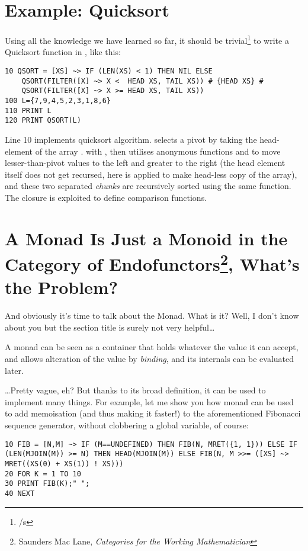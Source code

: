 \section[Example: Quicksort]{Example: Quicksort}

Using all the knowledge we have learned so far, it should be trivial\footnote{/s} to write a Quicksort function in \tbas, like this:

\begin{lstlisting}
10 QSORT = [XS] ~> IF (LEN(XS) < 1) THEN NIL ELSE 
    QSORT(FILTER([X] ~> X <  HEAD XS, TAIL XS)) # {HEAD XS} # 
    QSORT(FILTER([X] ~> X >= HEAD XS, TAIL XS))
100 L={7,9,4,5,2,3,1,8,6}
110 PRINT L
120 PRINT QSORT(L)
\end{lstlisting}

Line 10 implements quicksort algorithm.  selects a pivot by taking the head-element of the array . with , then utilises anonymous functions  and  to move lesser-than-pivot values to the left and greater to the right (the head element itself does not get recursed, here  is applied to make head-less copy of the array), and these two separated \emph{chunks} are recursively sorted using the same  function. The closure is exploited to define comparison functions.

\section[Monad]{A Monad Is Just a Monoid in the Category of Endofunctors\footnote{Saunders Mac Lane, \emph{Categories for the Working Mathematician}}, What's the Problem?}

And obviously it's time to talk about the Monad. What is it? Well, I don't know about you but the section title is surely not very helpful\ldots

A monad can be seen as a container that holds whatever the value it can accept, and allows alteration of the value by \emph{binding}, and its internals can be evaluated later.

\ldots Pretty vague, eh? But thanks to its broad definition, it can be used to implement many things. For example, let me show you how monad can be used to add memoisation (and thus making it faster!) to the aforementioned Fibonacci sequence generator, without clobbering a global variable, of course:

\begin{lstlisting}
10 FIB = [N,M] ~> IF (M==UNDEFINED) THEN FIB(N, MRET({1, 1})) ELSE IF (LEN(MJOIN(M)) >= N) THEN HEAD(MJOIN(M)) ELSE FIB(N, M >>= ([XS] ~> MRET((XS(0) + XS(1)) ! XS)))
20 FOR K = 1 TO 10
30 PRINT FIB(K);" ";
40 NEXT
\end{lstlisting}

